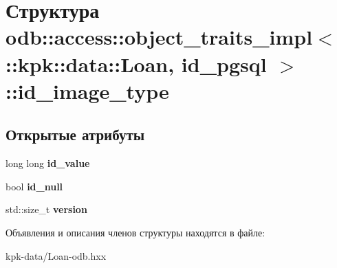 \hypertarget{structodb_1_1access_1_1object__traits__impl_3_01_1_1kpk_1_1data_1_1_loan_00_01id__pgsql_01_4_1_1id__image__type}{}\section{Структура odb\+:\+:access\+:\+:object\+\_\+traits\+\_\+impl$<$ \+:\+:kpk\+:\+:data\+:\+:Loan, id\+\_\+pgsql $>$\+:\+:id\+\_\+image\+\_\+type}
\label{structodb_1_1access_1_1object__traits__impl_3_01_1_1kpk_1_1data_1_1_loan_00_01id__pgsql_01_4_1_1id__image__type}
\subsection*{Открытые атрибуты}
\begin{DoxyCompactItemize}
\item 
long long {\bfseries id\+\_\+value}\hypertarget{structodb_1_1access_1_1object__traits__impl_3_01_1_1kpk_1_1data_1_1_loan_00_01id__pgsql_01_4_1_1id__image__type_a0a7534d08a89dabe3fd4e04e75454964}{}\label{structodb_1_1access_1_1object__traits__impl_3_01_1_1kpk_1_1data_1_1_loan_00_01id__pgsql_01_4_1_1id__image__type_a0a7534d08a89dabe3fd4e04e75454964}

\item 
bool {\bfseries id\+\_\+null}\hypertarget{structodb_1_1access_1_1object__traits__impl_3_01_1_1kpk_1_1data_1_1_loan_00_01id__pgsql_01_4_1_1id__image__type_a23c436ed3376b1322edb921e6f410331}{}\label{structodb_1_1access_1_1object__traits__impl_3_01_1_1kpk_1_1data_1_1_loan_00_01id__pgsql_01_4_1_1id__image__type_a23c436ed3376b1322edb921e6f410331}

\item 
std\+::size\+\_\+t {\bfseries version}\hypertarget{structodb_1_1access_1_1object__traits__impl_3_01_1_1kpk_1_1data_1_1_loan_00_01id__pgsql_01_4_1_1id__image__type_a819bb7cca4dadc6cbfde747d87a45f1c}{}\label{structodb_1_1access_1_1object__traits__impl_3_01_1_1kpk_1_1data_1_1_loan_00_01id__pgsql_01_4_1_1id__image__type_a819bb7cca4dadc6cbfde747d87a45f1c}

\end{DoxyCompactItemize}


Объявления и описания членов структуры находятся в файле\+:\begin{DoxyCompactItemize}
\item 
kpk-\/data/Loan-\/odb.\+hxx\end{DoxyCompactItemize}
